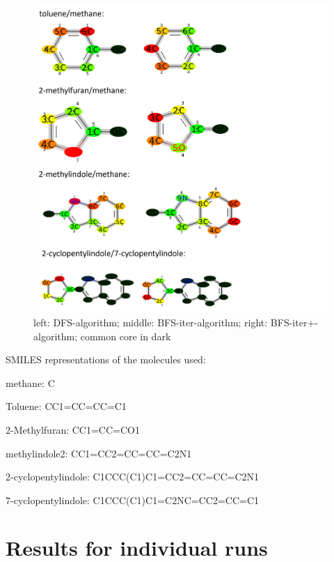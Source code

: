 \begin{figure}[!htb]
	
	\includegraphics[scale=0.65]{paper_routes1}\caption{left: DFS-algorithm; middle: BFS-iter-algorithm; right: BFS-iter+-algorithm; common core in dark}
	
\end{figure}
SMILES representations of the molecules used:


methane: C

Toluene: CC1=CC=CC=C1

2-Methylfuran: CC1=CC=CO1

methylindole2: CC1=CC2=CC=CC=C2N1

2-cyclopentylindole: C1CCC(C1)C1=CC2=CC=CC=C2N1

7-cyclopentylindole: C1CCC(C1)C1=C2NC=CC2=CC=C1





\section{Results for individual runs}

